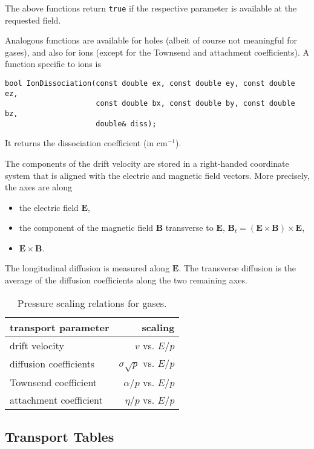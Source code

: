 The above functions return \texttt{true} if the respective parameter 
is available at the requested field.  

Analogous functions are available for holes 
(albeit of course not meaningful for gases), and also for ions 
(except for the Townsend and attachment coefficients). 
A function specific to ions is
\begin{lstlisting}
bool IonDissociation(const double ex, const double ey, const double ez,
                     const double bx, const double by, const double bz,
                     double& diss);
\end{lstlisting}
It returns the dissociation coefficient (in cm\(^{-1}\)). 

The components of the drift velocity are stored in a right-handed 
coordinate system that is aligned with the electric and magnetic field vectors.
More precisely, the axes are along
\begin{itemize}
  \item
  the electric field \(\mathbf{E}\),
  \item
  the component of the magnetic field \(\mathbf{B}\) transverse to 
  \(\mathbf{E}\), 
  \(\mathbf{B}_{t} = \left(\mathbf{E} \times \mathbf{B}\right) \times \textbf{E}\),
  \item
  \(\mathbf{E} \times \mathbf{B}\).
\end{itemize}
The longitudinal diffusion is measured along \(\mathbf{E}\).
The transverse diffusion is the average of the diffusion coefficients 
along the two remaining axes.

\begin{table}
  \centering
  \begin{tabular}{l r}
    \toprule
    transport parameter & scaling \\
    \midrule
    drift velocity & \(v\) vs. \(E/p\) \\
    diffusion coefficients & \(\sigma\sqrt{p}\) vs. \(E/p\) \\
    Townsend coefficient & \(\alpha / p\) vs. \(E/p\) \\
    attachment coefficient & \(\eta / p\) vs. \(E/p\) \\ 
    \bottomrule
  \end{tabular}
  \caption{Pressure scaling relations for gases.}
  \label{Tab:PressureScaling}
\end{table}

\subsection{Transport Tables}

